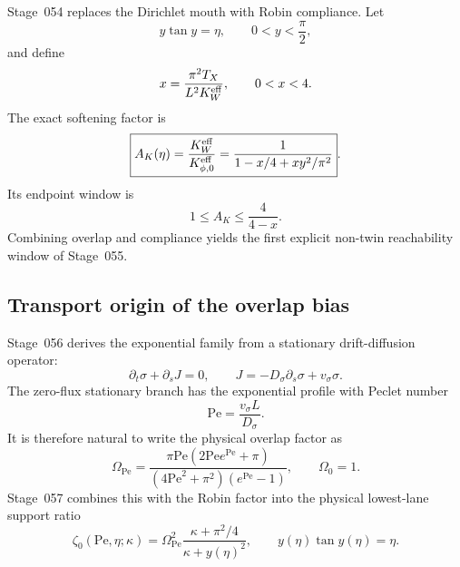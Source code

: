 Stage~054 replaces the Dirichlet mouth with Robin compliance.  Let
\begin{equation}
\label{eq:part03-robin-root}
y\tan y=\eta,
\qquad
0<y<\frac{\pi}{2},
\end{equation}
and define
\begin{equation}
\label{eq:part03-robin-x}
x=\frac{\pi^2T_X}{L^2K_W^{\rm eff}},
\qquad
0<x<4.
\end{equation}
The exact softening factor is
\begin{equation}
\label{eq:part03-AK}
\boxed{
A_K(\eta)=\frac{K_W^{\rm eff}}{K_{\phi,0}^{\rm eff}}
=\frac{1}{1-x/4+xy^2/\pi^2}}.
\end{equation}
Its endpoint window is
\begin{equation}
\label{eq:part03-AK-window}
1\leq A_K\leq\frac{4}{4-x}.
\end{equation}
Combining overlap and compliance yields the first explicit non-twin reachability window of Stage~055.

\subsection{Transport origin of the overlap bias}
\label{subsec:part03-transport-origin}

Stage~056 derives the exponential family from a stationary drift-diffusion operator:
\begin{equation}
\label{eq:part03-drift-diffusion}
\partial_t\sigma+
\partial_sJ=0,
\qquad
J=-D_\sigma\partial_s\sigma+v_\sigma\sigma.
\end{equation}
The zero-flux stationary branch has the exponential profile with Peclet number
\begin{equation}
\label{eq:part03-Pe-def}
\mathrm{Pe}=\frac{v_\sigma L}{D_\sigma}.
\end{equation}
It is therefore natural to write the physical overlap factor as
\begin{equation}
\label{eq:part03-Omega-Pe}
\boxed{
\Omega_{\mathrm{Pe}}=
\frac{\pi\mathrm{Pe}\left(2\mathrm{Pe}e^{\mathrm{Pe}}+\pi\right)}{(4\mathrm{Pe}^2+\pi^2)(e^{\mathrm{Pe}}-1)},
\qquad
\Omega_0=1}.
\end{equation}
Stage~057 combines this with the Robin factor into the physical lowest-lane support ratio
\begin{equation}
\label{eq:part03-zeta-Pe-kappa-eta}
\boxed{
\zeta_0(\mathrm{Pe},\eta;\kappa)
=\Omega_{\mathrm{Pe}}^2\frac{\kappa+\pi^2/4}{\kappa+y(\eta)^2},
\qquad
 y(\eta)\tan y(\eta)=\eta}.
\end{equation}

